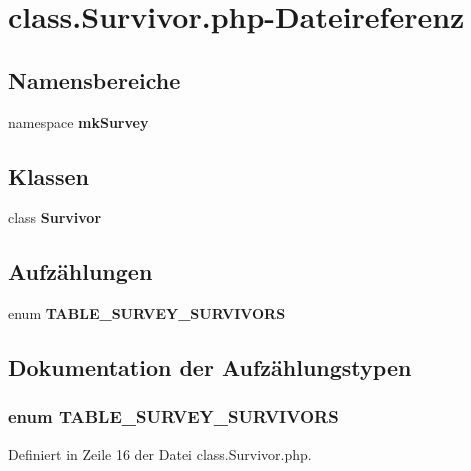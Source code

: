 \section{class.Survivor.php-Dateireferenz}
\label{class_8Survivor_8php}
\subsection*{Namensbereiche}
\begin{CompactItemize}
\item 
namespace {\bf mkSurvey}
\end{CompactItemize}
\subsection*{Klassen}
\begin{CompactItemize}
\item 
class {\bf Survivor}
\end{CompactItemize}
\subsection*{Aufzählungen}
\begin{CompactItemize}
\item 
enum {\bf TABLE\_\-SURVEY\_\-SURVIVORS} 
\end{CompactItemize}


\subsection{Dokumentation der Aufzählungstypen}
\subsubsection{\setlength{\rightskip}{0pt plus 5cm}enum {\bf TABLE\_\-SURVEY\_\-SURVIVORS}}\label{class_8Survivor_8php_bbc1b70a7be24984070c9a661eab2655}




Definiert in Zeile 16 der Datei class.Survivor.php.